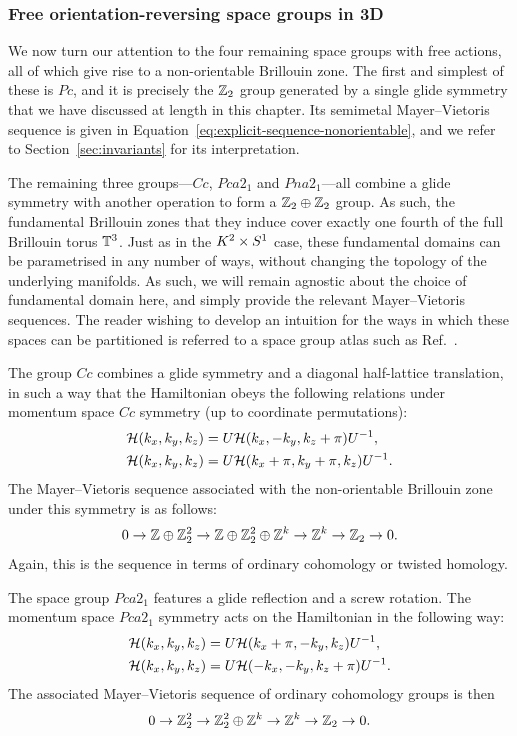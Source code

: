 \subsubsection{Free orientation-reversing space groups in 3D}

We now turn our attention to the four remaining space groups with free actions, all of which give rise to a non-orientable Brillouin zone. The first and simplest of these is $Pc$, and it is precisely the $\mathbb{Z}_2$ group generated by a single glide symmetry that we have discussed at length in this chapter. Its semimetal Mayer--Vietoris sequence is given in Equation~\eqref{eq:explicit-sequence-nonorientable}, and we refer to Section~\ref{sec:invariants} for its interpretation.

The remaining three groups---$Cc$, $Pca2_1$ and $Pna2_1$---all combine a glide symmetry with another operation to form a $\mathbb{Z}_2\oplus\mathbb{Z}_2$ group. As such, the fundamental Brillouin zones that they induce cover exactly one fourth of the full Brillouin torus $\mathbb{T}^3$. Just as in the $K^2\times S^1$ case, these fundamental domains can be parametrised in any number of ways, without changing the topology of the underlying manifolds. As such, we will remain agnostic about the choice of fundamental domain here, and simply provide the relevant Mayer--Vietoris sequences. The reader wishing to develop an intuition for the ways in which these spaces can be partitioned is referred to a space group atlas such as Ref.~\cite{Cockcroft_CD-ROM}.

The group $Cc$ combines a glide symmetry and a diagonal half-lattice translation, in such a way that the Hamiltonian obeys the following relations under momentum space $Cc$ symmetry (up to coordinate permutations):
\begin{align*}
	\mathcal{H}(k_x, k_y, k_z) &= U\mathcal{H}(k_x, -k_y, k_z+\pi)U^{-1}, \\
	\mathcal{H}(k_x, k_y, k_z) &= U\mathcal{H}(k_x+\pi, k_y+\pi, k_z)U^{-1}.
\end{align*}
The Mayer--Vietoris sequence associated with the non-orientable Brillouin zone under this symmetry is as follows:
\begin{equation}
	0 \to \mathbb{Z}\oplus\mathbb{Z}_2^2 \to \mathbb{Z}\oplus\mathbb{Z}_2^2\oplus\mathbb{Z}^k \to \mathbb{Z}^k \to \mathbb{Z}_2 \to 0.
\end{equation}
Again, this is the sequence in terms of ordinary cohomology or twisted homology.

The space group $Pca2_1$ features a glide reflection and a screw rotation. The momentum space $Pca2_1$ symmetry acts on the Hamiltonian in the following way:
\begin{align*}
	\mathcal{H}(k_x, k_y, k_z) &= U\mathcal{H}(k_x+\pi, -k_y, k_z)U^{-1}, \\
	\mathcal{H}(k_x, k_y, k_z) &= U\mathcal{H}(-k_x, -k_y, k_z+\pi)U^{-1}.
\end{align*}
The associated Mayer--Vietoris sequence of ordinary cohomology groups is then
\begin{equation}
	0 \to \mathbb{Z}_2^2 \to \mathbb{Z}_2^2\oplus\mathbb{Z}^k \to \mathbb{Z}^k \to \mathbb{Z}_2 \to 0.
\end{equation}


